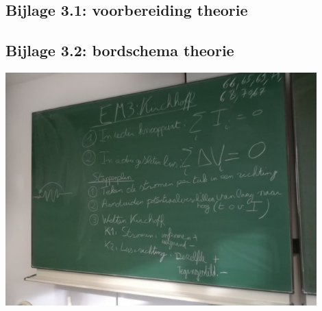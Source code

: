 \subsection*{Bijlage 3.1: voorbereiding theorie}
\subsection*{Bijlage 3.2: bordschema theorie}
\begin{center}
	\includegraphics[width=0.9\textwidth]{Bord3}
\end{center}
\newpage








